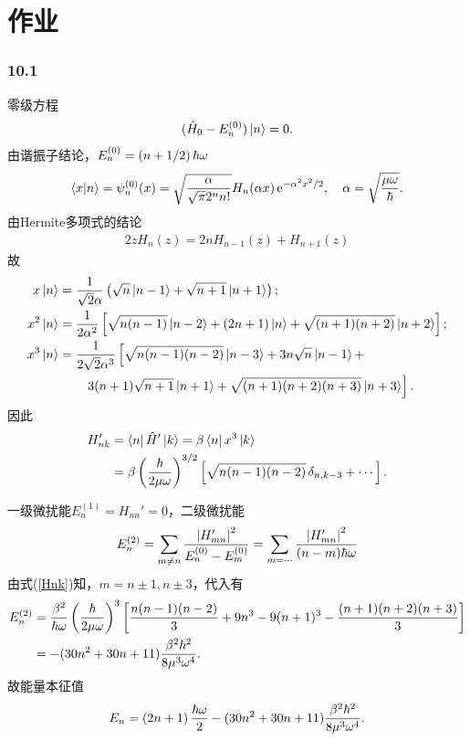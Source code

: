 \def\coursename{微扰论作业}



\renewcommand*{\r}{\bm r}
\newcommand{\qo}[1]{\bm{\hat #1}\!\mathop{}}


	\part{作业}
	\section{10.1}
	零级方程 
	\begin{align}
		(\hat H_0-E_n^{(0)})\left\vert n\right\rangle=0.
	\end{align}
	由谐振子结论，$E_n^{(0)}=\left(n+1/2\right)\hbar\omega$
	\begin{align}
		\left\langle x\middle\vert n\right\rangle=\psi_n^{(0)}(x)=\sqrt{\frac\alpha{\sqrt\pi 2^nn!}}H_n(\alpha x)\mathop{}\!\mathrm{e}^{-\alpha^2x^2/2},\quad\alpha=\sqrt{\frac{\mu\omega}\hbar}.
	\end{align}
	由Hermite多项式的结论
	\begin{align}
		2z H_n(z)=2nH_{n-1}(z)+H_{n+1}(z)
	\end{align}
	故
	{\small\begin{align}
		x\ket n&=\frac1{\sqrt2\alpha}\kh{\sqrt n\ket{n-1}+\sqrt{n+1}\ket{n+1}};\\
		x^2\ket n&%
		=\frac1{2\alpha^2}\fkh{\sqrt{n(n-1)}\ket{n-2}+(2n+1)\ket n+\sqrt{(n+1)(n+2)}\ket{n+2}};\\\notag
		x^3\ket n&=\frac1{2\sqrt2\alpha^3}\left[\sqrt{n(n-1)(n-2)}\ket{n-3}+3n\sqrt n\ket{n-1}+\right.\\
		&\qquad\left. 3(n+1)\sqrt{n+1}\ket{n+1}+\sqrt{(n+1)(n+2)(n+3)}\ket{n+3}\right].
	\end{align}}
	因此 
	\begin{align}\notag
		H_{nk}'&=\left\langle n\right\vert\hat H'\left\vert k\right\rangle=\beta\left\langle n\right\vert x^3\left\vert k\right\rangle\\
		&=\beta\left(\frac\hbar{2\mu\omega}\right)^{3/2}\left[\sqrt{n(n-1)(n-2)}\mathop{}\!\delta_{n,k-3}+\cdots\right].\label{Hnk}
	\end{align}

	一级微扰能$E_n^{(1)}=H_{nn}'=0$，二级微扰能
	\begin{align}
		E_n^{(2)}=\sum_{m\neq n}\frac{\left\lvert H_{mn}'\right\rvert^2}{E_n^{(0)}-E_m^{(0)}}=\sum_{m=\cdots}\frac{\left\lvert H_{mn}'\right\rvert^2}{(n-m)\hbar\omega}
	\end{align}
	由式(\ref{Hnk})知，$m=n\pm 1,n\pm 3$，代入有
	{\footnotesize\begin{align}\notag
		E_n^{(2)}&=\frac{\beta^2}{\hbar\omega}\left(\frac\hbar{2\mu\omega}\right)^3\left[\frac{n(n-1)(n-2)}3+9n^3-9(n+1)^3-\frac{(n+1)(n+2)(n+3)}3\right]\\
		&=-(30n^2+30n+11)\frac{\beta^2\hbar^2}{8\mu^3\omega^4}.
	\end{align}}
	故能量本征值 
	\begin{align}
		E_n=\left(2n+1\right)\frac{\hbar\omega}2-(30n^2+30n+11)\frac{\beta^2\hbar^2}{8\mu^3\omega^4}.
	\end{align}

